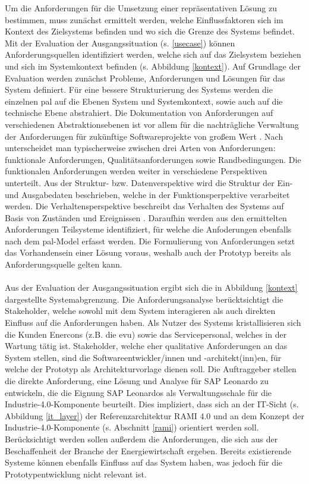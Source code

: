 Um die Anforderungen für die Umsetzung einer repräsentativen Lösung zu bestimmen, muss zunächst ermittelt werden, welche Einflussfaktoren sich im Kontext des Zielsystems befinden und wo sich die Grenze des Systems befindet. Mit der Evaluation der Ausgangssituation (s. \ref{usecase}) können Anforderungsquellen identifiziert werden, welche sich auf das Zielsystem beziehen und sich im Systemkontext befinden (s. Abbildung \ref{kontext}). Auf Grundlage der Evaluation werden zunächst Probleme, Anforderungen und Lösungen für das System definiert. Für eine bessere Strukturierung des Systems werden die einzelnen \ac{pal} auf die Ebenen System und Systemkontext, sowie auch auf die technische Ebene abstrahiert. Die Dokumentation von Anforderungen auf verschiedenen Abstraktionsebenen ist vor allem für die nachträgliche Verwaltung der Anforderungen für zukünftige Softwareprojekte von großem Wert \citep{Lauenroth2016}. Nach \citet{IREB2017} unterscheidet man typischerweise zwischen drei Arten von Anforderungen: funktionale Anforderungen, Qualitätsanforderungen sowie Randbedingungen. Die funktionalen Anforderungen werden weiter in verschiedene Perspektiven unterteilt. Aus der Struktur- bzw. Datenverspektive wird die Struktur der Ein- und Ausgabedaten beschrieben, welche in der Funktionsperpektive verarbeitet werden. Die Verhaltensperspektive beschreibt das Verhalten des Systems auf Basis von Zuständen und Ereignissen \citep{Lauenroth2016}.
Daraufhin werden aus den ermittelten Anforderungen Teilsysteme identifiziert, für welche die Anfoderungen ebenfalls nach dem \ac{pal}-Model erfasst werden. Die Formulierung von Anforderungen setzt das Vorhandensein einer Lösung voraus, weshalb auch der Prototyp bereits als Anforderungsquelle gelten kann.
\\\\Aus der Evaluation der Ausgangssituation ergibt sich die in Abbildung \ref{kontext} dargestellte Systemabgrenzung. Die Anforderungsanalyse berücktsichtigt die Stakeholder, welche sowohl mit dem System interagieren als auch direkten Einfluss auf die Anforderungen haben. Als Nutzer des Systems kristallisieren sich die Kunden Enercons (z.B. die \ac{evu}) sowie das Servicepersonal, welches in der Wartung tätig ist. Stakeholder, welche eher qualitative Anforderungen an das System stellen, sind die Softwareentwickler/innen und -architekt(inn)en, für welche der Prototyp als Architekturvorlage dienen soll. Die Auftraggeber stellen die direkte Anforderung, eine Lösung und Analyse für SAP Leonardo zu entwickeln, die die Eignung SAP Leonardos als Verwaltungsschale für die Industrie-4.0-Komponente beurteilt. Dies impliziert, dass sich an der IT-Sicht (s. Abbildung \ref{it_layer}) der Referenzarchitektur RAMI 4.0 und an dem Konzept der Industrie-4.0-Komponente (s. Abschnitt \ref{rami}) orientiert werden soll. Berücksichtigt werden sollen außerdem die Anforderungen, die sich aus der Beschaffenheit der Branche der Energiewirtschaft ergeben. Bereits existierende Systeme können ebenfalls Einfluss auf das System haben, was jedoch für die Prototypentwicklung nicht relevant ist.


